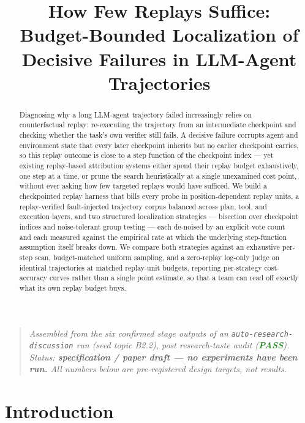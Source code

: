 \documentclass[11pt]{article}
\title{\textbf{How Few Replays Suffice:\\ Budget-Bounded Localization of Decisive Failures in LLM-Agent Trajectories}}
\author{}
\date{}
\begin{document}
\maketitle
\vspace{-2em}

\begin{quote}
\small\textit{Assembled from the six confirmed stage outputs of an \texttt{auto-research-discussion} run (seed topic B2.2), post research-taste audit (\textcolor{ForestGreen}{\textbf{PASS}}). Status: \textbf{specification / paper draft --- no experiments have been run.} All numbers below are pre-registered design targets, not results.}
\end{quote}

\begin{abstract}
Diagnosing why a long LLM-agent trajectory failed increasingly relies on counterfactual replay: re-executing the trajectory from an intermediate checkpoint and checking whether the task's own verifier still fails. A decisive failure corrupts agent and environment state that every later checkpoint inherits but no earlier checkpoint carries, so this replay outcome is close to a step function of the checkpoint index --- yet existing replay-based attribution systems either spend their replay budget exhaustively, one step at a time, or prune the search heuristically at a single unexamined cost point, without ever asking how few targeted replays would have sufficed. We build a checkpointed replay harness that bills every probe in position-dependent replay units, a replay-verified fault-injected trajectory corpus balanced across plan, tool, and execution layers, and two structured localization strategies --- bisection over checkpoint indices and noise-tolerant group testing --- each de-noised by an explicit vote count and each measured against the empirical rate at which the underlying step-function assumption itself breaks down. We compare both strategies against an exhaustive per-step scan, budget-matched uniform sampling, and a zero-replay log-only judge on identical trajectories at matched replay-unit budgets, reporting per-strategy cost-accuracy curves rather than a single point estimate, so that a team can read off exactly what its own replay budget buys.
\end{abstract}

\section{Introduction}
\end{document}
